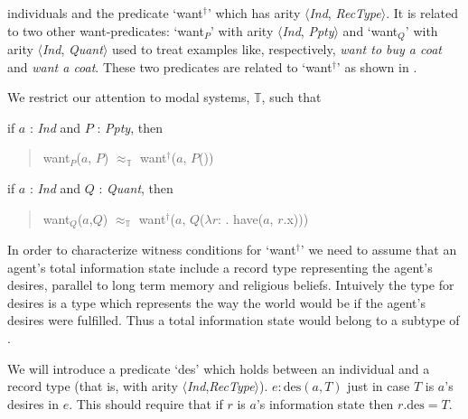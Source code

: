 individuals and the predicate `want$^\dagger$' which has arity
$\langle$\textit{Ind}, \textit{RecType}$\rangle$.  It is related to
two other want-predicates: `want$_P$' with arity
$\langle$\textit{Ind}, \textit{Ppty}$\rangle$ and `want$_Q$' with
arity $\langle$\textit{Ind}, \textit{Quant}$\rangle$ used to treat
examples like,
respectively, \textit{want to buy a coat} and \textit{want a coat}.
These two predicates are related to `want$^\dagger$' as shown in
\nexteg{}.
\begin{ex}
  We restrict our attention to modal systems, $\mathbb{T}$, such that
\begin{subex} 
 
\item if $a$ : \textit{Ind} and $P$ : \textit{Ppty}, then 
\begin{quote}
want$_P$($a$, $P$) $\approx_{\mathbb{T}}$ want$^\dagger$($a$, $P$())
\end{quote} 
 
\item if $a$ : \textit{Ind} and $Q$ : \textit{Quant}, then 
\begin{quote}
want$_Q$($a$,$Q$) $\approx_{\mathbb{T}}$
want$^\dagger$($a$, $Q$($\lambda
r$: . have($a$, $r$.x)))
\end{quote} 
\end{subex} 
\label{ex:want-witcond} 
   
\end{ex}



In order to characterize witness conditions for `want$^{\dagger}$' we
need to assume that an agent's total information state include a
record type representing the agent's desires, parallel to long term
memory and religious beliefs.  Intuively the type for desires is a
type which represents the way the world would be if the agent's
desires were fulfilled.  Thus a total information state would belong
to a subtype of \nexteg{}.
\begin{ex} 
    \end{ex}
    
We will introduce a predicate `des' which holds between an
individual and a record type (that is, with arity
$\langle$\textit{Ind},\textit{RecType}$\rangle$).  $e:\text{des}(a,T)$
just in case $T$ is $a$'s desires in $e$.  This should require that if
$r$ is $a$'s information state then $r.\text{des}=T$.  %

